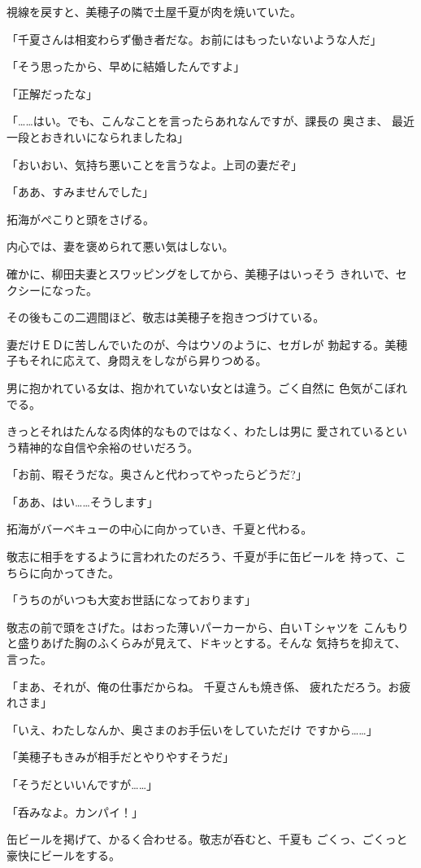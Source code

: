 ﻿\documentclass[
    book,tate,
    line_length=30zw,
    jafontsize=12pt,
    paper=b5j,
    landscape,
    ]{jlreq}
\begin{document}
視線を戻すと、美穂子の隣で土屋千夏が肉を焼いていた。

「千夏さんは相変わらず働き者だな。お前にはもったいないような人だ」

「そう思ったから、早めに結婚したんですよ」

「正解だったな」

「……はい。でも、こんなことを言ったらあれなんですが、課長の
奥さま、 最近一段とおきれいになられましたね」

「おいおい、気持ち悪いことを言うなよ。上司の妻だぞ」

「ああ、すみませんでした」

拓海がぺこりと頭をさげる。

内心では、妻を褒められて悪い気はしない。

確かに、柳田夫妻とスワッピングをしてから、美穂子はいっそう
きれいで、セクシーになった。

その後もこの二週間ほど、敬志は美穂子を抱きつづけている。

妻だけＥＤに苦しんでいたのが、今はウソのように、セガレが
勃起する。美穂子もそれに応えて、身悶えをしながら昇りつめる。

男に抱かれている女は、抱かれていない女とは違う。ごく自然に
色気がこぼれでる。

きっとそれはたんなる肉体的なものではなく、わたしは男に
愛されているという精神的な自信や余裕のせいだろう。

「お前、暇そうだな。奥さんと代わってやったらどうだ?」

「ああ、はい……そうします」

拓海がバーベキューの中心に向かっていき、千夏と代わる。

敬志に相手をするように言われたのだろう、千夏が手に缶ビールを
持って、こちらに向かってきた。

「うちのがいつも大変お世話になっております」

敬志の前で頭をさげた。はおった薄いパーカーから、白いＴシャツを
こんもりと盛りあげた胸のふくらみが見えて、ドキッとする。そんな
気持ちを抑えて、言った。

「まあ、それが、俺の仕事だからね。 千夏さんも焼き係、
疲れただろう。お疲れさま」

「いえ、わたしなんか、奥さまのお手伝いをしていただけ
ですから……」

「美穂子もきみが相手だとやりやすそうだ」

「そうだといいんですが……」

「呑みなよ。カンパイ！」

缶ビールを掲げて、かるく合わせる。敬志が呑むと、千夏も
ごくっ、ごくっと豪快にビールをする。
\end{document}
